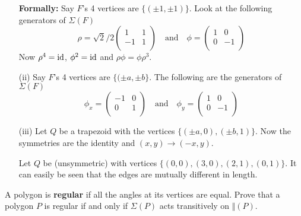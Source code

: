 \begin{myenumerate}
\begin{itemize}
   \textbf{Formally:}
   Say $F$'s 4 vertices are \(\{(\pm1,\pm1)\}\).
   Look at the following generators of \(\Sigma(F)\)
   \begin{equation}
     \rho = \sqrt{2}/2\left(
      \begin{array}{rl}
       1 & 1 \\
       -1 & 1 \\
      \end{array}
     \right)
     \quad\textrm{and}\quad
     \phi = \left(
      \begin{array}{lr}
       1 & 0 \\
       0 & -1 \\
      \end{array}
     \right)
   \end{equation}
   Now \(\rho^4=\mathop{\rm id}\nolimits\), \(\phi^2=\mathop{\rm id}\nolimits\) and \(\rho\phi = \phi\rho^3\).
 \item[(ii)]
   Say $F$'s 4 vertices are \(\{(\pm a,\pm b\}\).
   The following are the generators of \(\Sigma(F)\)
   \begin{equation}
     \phi_x = \left(
      \begin{array}{rl}
       -1 & 0 \\
       0  & 1 \\
      \end{array}
     \right)
     \quad\textrm{and}\quad
     \phi_y = \left(
      \begin{array}{lr}
       1 &  0 \\
       0 & -1 \\
      \end{array}
     \right)
   \end{equation}
 \item[(iii)]
    Let $Q$ be a trapezoid with the vertices \(\{(\pm a, 0), (\pm b, 1)\}\).
    Now the symmetries are the identity and \((x,y)\rightarrow (-x,y)\).

    Let $Q$ be (unsymmetric) with vertices \(\{(0,0), (3,0), (2,1), (0,1)\}\).
    It can easily be seen that the edges  are mutually different in length.
\end{itemize}

\item
\begin{excopy}
A polygon is
\textbf{regular} if all the angles at its vertices are equal.
Prove that a polygon $P$ is regular if and only if \(\Sigma(P)\)
acts transitively on \(\Vert(P)\).
\end{excopy}


\end{myenumerate}
